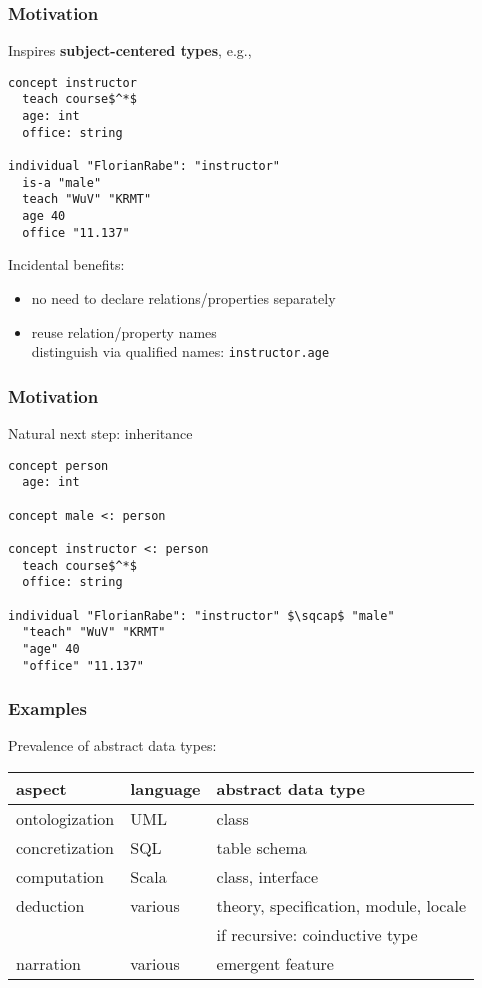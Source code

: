 \begin{frame}[fragile]\frametitle{Motivation}
Inspires \textbf{subject-centered types}, e.g.,

\begin{lstlisting}
concept instructor
  teach course$^*$
  age: int
  office: string

individual "FlorianRabe": "instructor"
  is-a "male"
  teach "WuV" "KRMT"
  age 40
  office "11.137"
\end{lstlisting}

Incidental benefits:
\begin{itemize}
\item no need to declare relations/properties separately
\item reuse relation/property names \\ distinguish via qualified names: \lstinline|instructor.age|
\end{itemize}
\end{frame}

\begin{frame}[fragile]\frametitle{Motivation}
Natural next step: inheritance

\begin{lstlisting}
concept person
  age: int
  
concept male <: person

concept instructor <: person
  teach course$^*$
  office: string

individual "FlorianRabe": "instructor" $\sqcap$ "male"
  "teach" "WuV" "KRMT"
  "age" 40
  "office" "11.137"
\end{lstlisting}

\end{frame}

\begin{frame}\frametitle{Examples}
Prevalence of abstract data types:

\begin{center}
\begin{tabular}{l|ll}
aspect & language & abstract data type \\
\hline
ontologization & UML & class \\
concretization & SQL & table schema \\
computation & Scala & class, interface \\
deduction & various & theory, specification, module, locale \\
 & & if recursive: coinductive type \\
narration & various & emergent feature
\end{tabular}
\end{center}

\end{frame}

